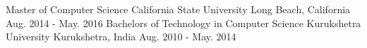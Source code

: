 

\begin{cventries}

  \cventry
    {Master of Computer Science} %
    {California State University} %
    {Long Beach, California} %
    {Aug. 2014 - May. 2016} %
    {}
  \cventry
    {Bachelors of Technology in Computer Science} %
    {Kurukshetra University} %
    {Kurukshetra, India} %
    {Aug. 2010 - May. 2014} %
    {}

\end{cventries}
